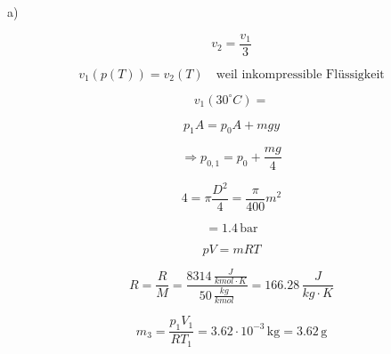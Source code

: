a)

\[
v_2 = \frac{v_1}{3}
\]

\[
v_1 (p(T)) = v_2 (T) \quad \text{weil inkompressible Flüssigkeit}
\]

\[
v_1 (30^\circ C) = 
\]

\[
p_1 A = p_0 A + m g y
\]

\[
\Rightarrow p_{0,1} = p_0 + \frac{m g}{4}
\]

\[
4 = \pi \frac{D^2}{4} = \frac{\pi}{400} m^2
\]

\[
= 1.4 \, \text{bar}
\]

\[
pV = mRT
\]

\[
R = \frac{R}{M} = \frac{8314 \, \frac{J}{kmol \cdot K}}{50 \, \frac{kg}{kmol}} = 166.28 \, \frac{J}{kg \cdot K}
\]

\[
m_3 = \frac{p_1 V_1}{R T_1} = 3.62 \cdot 10^{-3} \, \text{kg} = 3.62 \, \text{g}
\]